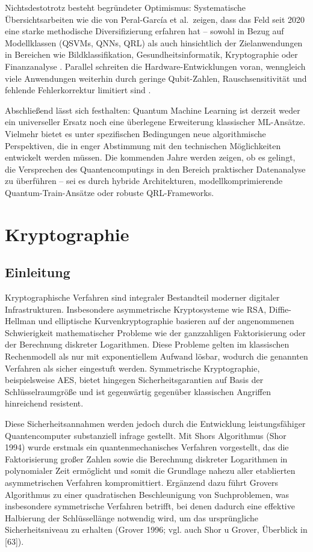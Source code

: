 Nichtsdestotrotz besteht begründeter Optimismus: Systematische Übersichtsarbeiten wie die von Peral-García et al.\ zeigen, dass das Feld seit 2020 eine starke methodische Diversifizierung erfahren hat – sowohl in Bezug auf Modellklassen (QSVMs, QNNs, QRL) als auch hinsichtlich der Zielanwendungen in Bereichen wie Bildklassifikation, Gesundheitsinformatik, Kryptographie oder Finanzanalyse . Parallel schreiten die Hardware-Entwicklungen voran, wenngleich viele Anwendungen weiterhin durch geringe Qubit-Zahlen, Rauschsensitivität und fehlende Fehlerkorrektur limitiert sind \cite{peral-garciaSystematicLiteratureReview2024}.

Abschließend lässt sich festhalten: Quantum Machine Learning ist derzeit weder ein universeller Ersatz noch eine überlegene Erweiterung klassischer ML-Ansätze. Vielmehr bietet es unter spezifischen Bedingungen neue algorithmische Perspektiven, die in enger Abstimmung mit den technischen Möglichkeiten entwickelt werden müssen. Die kommenden Jahre werden zeigen, ob es gelingt, die Versprechen des Quantencomputings in den Bereich praktischer Datenanalyse zu überführen – sei es durch hybride Architekturen, modellkomprimierende Quantum-Train-Ansätze oder robuste QRL-Frameworks.


\vspace{2em}

\section{Kryptographie}
\subsection{Einleitung}
Kryptographische Verfahren sind integraler Bestandteil moderner digitaler Infrastrukturen. Insbesondere asymmetrische Kryptosysteme wie RSA, Diffie-Hellman und elliptische Kurvenkryptographie basieren auf der angenommenen Schwierigkeit mathematischer Probleme wie der ganzzahligen Faktorisierung oder der Berechnung diskreter Logarithmen. Diese Probleme gelten im klassischen Rechenmodell als nur mit exponentiellem Aufwand lösbar, wodurch die genannten Verfahren als sicher eingestuft werden. Symmetrische Kryptographie, beispielsweise AES, bietet hingegen Sicherheitsgarantien auf Basis der Schlüsselraumgröße und ist gegenwärtig gegenüber klassischen Angriffen hinreichend resistent.

Diese Sicherheitsannahmen werden jedoch durch die Entwicklung leistungsfähiger Quantencomputer substanziell infrage gestellt. Mit Shors Algorithmus (Shor 1994) wurde erstmals ein quantenmechanisches Verfahren vorgestellt, das die Faktorisierung großer Zahlen sowie die Berechnung diskreter Logarithmen in polynomialer Zeit ermöglicht und somit die Grundlage nahezu aller etablierten asymmetrischen Verfahren kompromittiert. Ergänzend dazu führt Grovers Algorithmus zu einer quadratischen Beschleunigung von Suchproblemen, was insbesondere symmetrische Verfahren betrifft, bei denen dadurch eine effektive Halbierung der Schlüssellänge notwendig wird, um das ursprüngliche Sicherheitsniveau zu erhalten (Grover 1996; vgl. auch Shor u Grover, Überblick in [63]).

